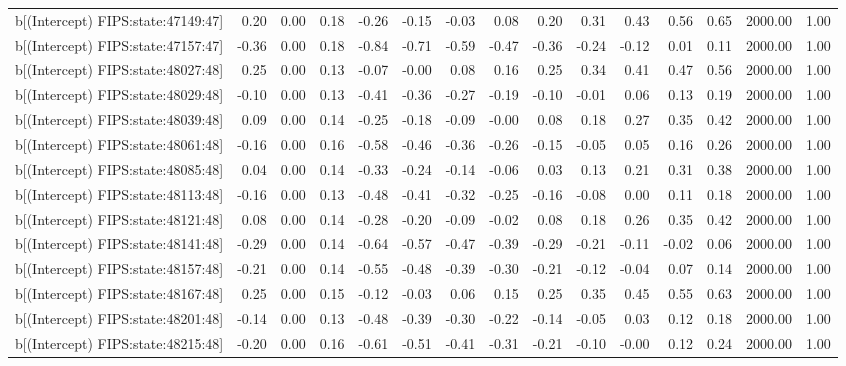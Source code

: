 \begin{table}[ht]
\begin{tabular}{rrrrrrrrrrrrrrr}
  b[(Intercept) FIPS:state:47149:47] & 0.20 & 0.00 & 0.18 & -0.26 & -0.15 & -0.03 & 0.08 & 0.20 & 0.31 & 0.43 & 0.56 & 0.65 & 2000.00 & 1.00 \\ 
  b[(Intercept) FIPS:state:47157:47] & -0.36 & 0.00 & 0.18 & -0.84 & -0.71 & -0.59 & -0.47 & -0.36 & -0.24 & -0.12 & 0.01 & 0.11 & 2000.00 & 1.00 \\ 
  b[(Intercept) FIPS:state:48027:48] & 0.25 & 0.00 & 0.13 & -0.07 & -0.00 & 0.08 & 0.16 & 0.25 & 0.34 & 0.41 & 0.47 & 0.56 & 2000.00 & 1.00 \\ 
  b[(Intercept) FIPS:state:48029:48] & -0.10 & 0.00 & 0.13 & -0.41 & -0.36 & -0.27 & -0.19 & -0.10 & -0.01 & 0.06 & 0.13 & 0.19 & 2000.00 & 1.00 \\ 
  b[(Intercept) FIPS:state:48039:48] & 0.09 & 0.00 & 0.14 & -0.25 & -0.18 & -0.09 & -0.00 & 0.08 & 0.18 & 0.27 & 0.35 & 0.42 & 2000.00 & 1.00 \\ 
  b[(Intercept) FIPS:state:48061:48] & -0.16 & 0.00 & 0.16 & -0.58 & -0.46 & -0.36 & -0.26 & -0.15 & -0.05 & 0.05 & 0.16 & 0.26 & 2000.00 & 1.00 \\ 
  b[(Intercept) FIPS:state:48085:48] & 0.04 & 0.00 & 0.14 & -0.33 & -0.24 & -0.14 & -0.06 & 0.03 & 0.13 & 0.21 & 0.31 & 0.38 & 2000.00 & 1.00 \\ 
  b[(Intercept) FIPS:state:48113:48] & -0.16 & 0.00 & 0.13 & -0.48 & -0.41 & -0.32 & -0.25 & -0.16 & -0.08 & 0.00 & 0.11 & 0.18 & 2000.00 & 1.00 \\ 
  b[(Intercept) FIPS:state:48121:48] & 0.08 & 0.00 & 0.14 & -0.28 & -0.20 & -0.09 & -0.02 & 0.08 & 0.18 & 0.26 & 0.35 & 0.42 & 2000.00 & 1.00 \\ 
  b[(Intercept) FIPS:state:48141:48] & -0.29 & 0.00 & 0.14 & -0.64 & -0.57 & -0.47 & -0.39 & -0.29 & -0.21 & -0.11 & -0.02 & 0.06 & 2000.00 & 1.00 \\ 
  b[(Intercept) FIPS:state:48157:48] & -0.21 & 0.00 & 0.14 & -0.55 & -0.48 & -0.39 & -0.30 & -0.21 & -0.12 & -0.04 & 0.07 & 0.14 & 2000.00 & 1.00 \\ 
  b[(Intercept) FIPS:state:48167:48] & 0.25 & 0.00 & 0.15 & -0.12 & -0.03 & 0.06 & 0.15 & 0.25 & 0.35 & 0.45 & 0.55 & 0.63 & 2000.00 & 1.00 \\ 
  b[(Intercept) FIPS:state:48201:48] & -0.14 & 0.00 & 0.13 & -0.48 & -0.39 & -0.30 & -0.22 & -0.14 & -0.05 & 0.03 & 0.12 & 0.18 & 2000.00 & 1.00 \\ 
  b[(Intercept) FIPS:state:48215:48] & -0.20 & 0.00 & 0.16 & -0.61 & -0.51 & -0.41 & -0.31 & -0.21 & -0.10 & -0.00 & 0.12 & 0.24 & 2000.00 & 1.00 \\ 

\end{tabular}
\end{table}
